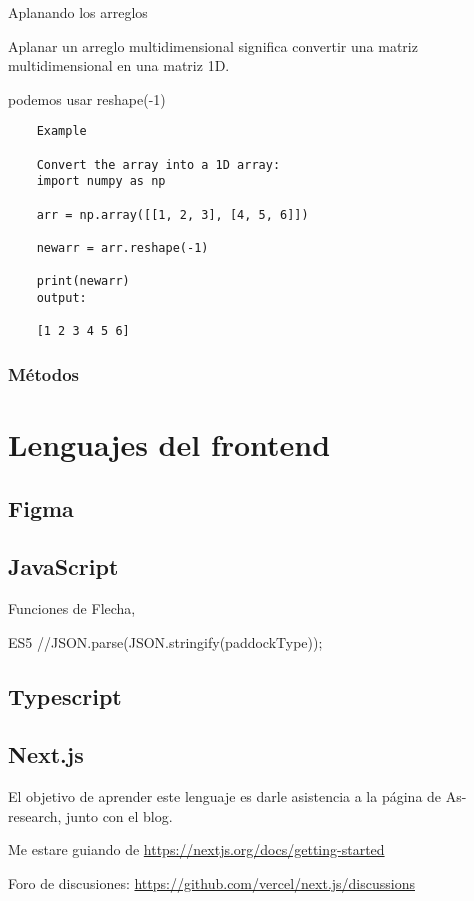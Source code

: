 Aplanando los arreglos

Aplanar un arreglo multidimensional significa convertir una matriz multidimensional en una matriz 1D.

podemos usar reshape(-1)

\begin{verbatim}
	Example
	
	Convert the array into a 1D array:
	import numpy as np
	
	arr = np.array([[1, 2, 3], [4, 5, 6]])
	
	newarr = arr.reshape(-1)
	
	print(newarr) 
	output:
	
	[1 2 3 4 5 6] 
\end{verbatim}
\section{M\'etodos}




\part{Lenguajes del frontend}

\chapter{Figma}

\chapter{JavaScript}


Funciones de Flecha, 

ES5 //JSON.parse(JSON.stringify(paddockType));

\chapter{Typescript}

\chapter{Next.js}

El objetivo de aprender este lenguaje es darle asistencia a la p\'agina de As-research, junto con el blog. 

Me estare guiando de \url{https://nextjs.org/docs/getting-started}

Foro de discusiones: \url{https://github.com/vercel/next.js/discussions}

